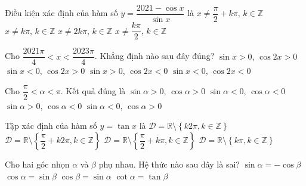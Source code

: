 \begin{ex}%
Điều kiện xác định của hàm số $y=\dfrac{2021-\cos x}{\sin x}$ là
\choice
{$x\ne\dfrac{\pi}{2}+k\pi ,\,k\in\mathbb{Z}$}
{\True $x\ne k\pi ,\,k\in\mathbb{Z}$}
{$x\ne 2k\pi ,\,k\in\mathbb{Z}$}
{$x\ne\dfrac{k\pi}{2},\,k\in\mathbb{Z}$}
\end{ex}

\begin{ex}%
Cho $\dfrac{2021\pi }{4}<x<\dfrac{2023\pi }{4}$. Khẳng định nào sau đây đúng?
\choice
{$\sin x>0$, $\cos 2x>0$}
{$\sin x<0$, $\cos 2x>0$}
{$\sin x>0$, $\cos 2x<0$}
{\True $\sin x<0$, $\cos 2x<0$}
\end{ex}

\begin{ex}%
Cho $\dfrac{\pi }{2}<\alpha <\pi$. Kết quả đúng là
\choice
{$\sin \alpha >0$, $\cos \alpha >0$}
{$\sin \alpha <0$, $\cos \alpha <0$}
{\True $\sin \alpha >0$, $\cos \alpha <0$}
{$\sin \alpha <0$, $\cos \alpha >0$}
\end{ex}

\begin{ex}%
Tập xác định của hàm số $y=\tan x$ là
\choice
{$\mathscr{D}=\mathbb{R}\setminus\left\{ k2\pi ,k\in\mathbb{Z}\right\}$}
{$\mathscr{D}=\mathbb{R}\setminus\left\{\dfrac{\pi}{2}+k2\pi ,k\in\mathbb{Z}\right\}$}
{\True $\mathscr{D}=\mathbb{R}\setminus\left\{\dfrac{\pi}{2}+k\pi ,k\in\mathbb{Z}\right\}$}
{$\mathscr{D}=\mathbb{R}\setminus\left\{ k\pi ,k\in\mathbb{Z}\right\}$}
\end{ex}

\begin{ex}%
Cho hai góc nhọn $\alpha $ và $\beta $ phụ nhau. Hệ thức nào sau đây là sai?
\choice
{\True $\sin \alpha =-\cos \beta $}
{$\cos \alpha =\sin \beta $}
{$\cos \beta =\sin \alpha $}
{$\cot \alpha =\tan \beta $}
\end{ex}

